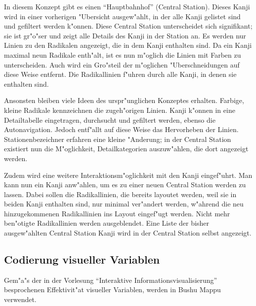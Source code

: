 In diesem Konzept gibt es einen "`Hauptbahnhof"' (Central Station). Dieses Kanji wird in einer vorherigen "Ubersicht ausgew"ahlt, in der alle Kanji gelistet sind und gefiltert werden k"onnen. Diese Central Station unterscheidet sich signifikant; sie ist gr"o"ser und zeigt alle Details des Kanji in der Station an. Es werden nur Linien zu den Radikalen angezeigt, die in dem Kanji enthalten sind. Da ein Kanji maximal neun Radikale enth"alt, ist es nun m"oglich die Linien mit Farben zu unterscheiden. Auch wird ein Gro"steil der m"oglichen "Uberschneidungen auf diese Weise entfernt. Die Radikallinien f"uhren durch alle Kanji, in denen sie enthalten sind.

Ansonsten bleiben viele Ideen des urspr"unglichen Konzeptes erhalten. Farbige, kleine Radikale kennzeichnen die zugeh"origen Linien. Kanji k"onnen in eine Detailtabelle eingetragen, durchsucht und gefiltert werden, ebenso die Autonavigation. Jedoch entf"allt auf diese Weise das Hervorheben der Linien. Stationenbezeichner erfahren eine kleine "Anderung; in der Central Station existiert nun die M"oglichkeit, Detailkategorien auszuw"ahlen, die dort angezeigt werden. 

Zudem wird eine weitere Interaktionsm"oglichkeit mit den Kanji eingef"uhrt. Man kann nun ein Kanji anw"ahlen, um es zu einer neuen Central Station werden zu lassen. Dabei sollen die Radikallinien, die bereits layoutet werden, weil sie in beiden Kanji enthalten sind, nur minimal ver"andert werden, w"ahrend die neu hinzugekommenen Radikallinien ins Layout eingef"ugt werden. Nicht mehr ben"otigte Radikallinien werden ausgeblendet. Eine Liste der bisher ausgew"ahlten Central Station Kanji wird in der Central Station selbst angezeigt.

\subsection{Codierung visueller Variablen}
Gem"a"s der in der Vorlesung "`Interaktive Informationsvisualisierung"' besprochenen Effektivit"at visueller Variablen, werden in Bushu Mappu verwendet. 

